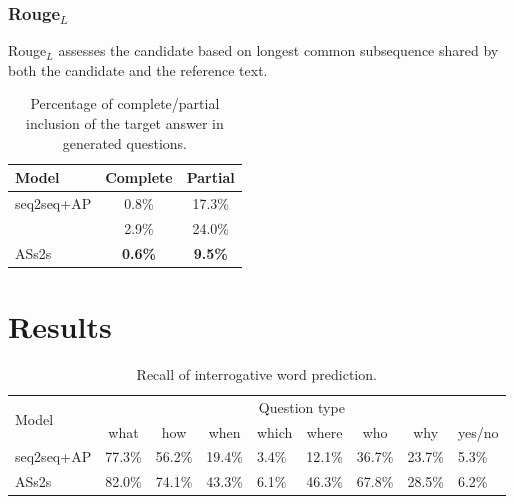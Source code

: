 \documentclass[letterpaper]{article} %
\newcommand\Tstrut{\rule{0pt}{2.3ex}}         %
\begin{document}
\subsubsection{Rouge\(_L\)}
Rouge\(_L\) assesses the candidate based on longest common subsequence shared by both the candidate and the reference text.

\begin{table}[!tb]
\centering
\begin{tabular}{|l|c|c|}
\hline
Model        & Complete & Partial\Tstrut  \\ \hline
seq2seq+AP & 0.8\%            & 17.3\%\Tstrut               \\ \hline
\cite{song2018leveraging}  & 2.9\%        & 24.0\%\Tstrut          \\ \hline
ASs2s    & \textbf{0.6\%}        & \textbf{9.5\%}\Tstrut           \\ \hline
\end{tabular}%
\caption{Percentage of complete/partial inclusion of the target answer in generated questions.}
\label{table:grasp answer}
\end{table}

\section{Results}

\begin{table}[!htb]
\centering
\begin{tabular}{|l|l|l|l|l|l|l|l|l|}
\hline
\multirow{2}{*}{Model} & \multicolumn{8}{c|}{Question type}\Tstrut  \\ \cline{2-9}
 & \multicolumn{1}{c|}{what} & \multicolumn{1}{c|}{how} & \multicolumn{1}{c|}{when} & \multicolumn{1}{c|}{which} & \multicolumn{1}{c|}{where} & \multicolumn{1}{c|}{who} & \multicolumn{1}{c|}{why} & \multicolumn{1}{c|}{yes/no}\Tstrut  \\ \hline
seq2seq+AP & 77.3\% & 56.2\% & 19.4\% & 3.4\% & 12.1\% & 36.7\% & 23.7\% & 5.3\%\Tstrut  \\ \hline
ASs2s & 82.0\% & 74.1\% & 43.3\% & 6.1\% & 46.3\% & 67.8\% & 28.5\% & 6.2\%\Tstrut  \\ \hline
\end{tabular}
\caption{Recall of interrogative word prediction.}
\label{table:interrogative word}
\end{table}
\end{document}
